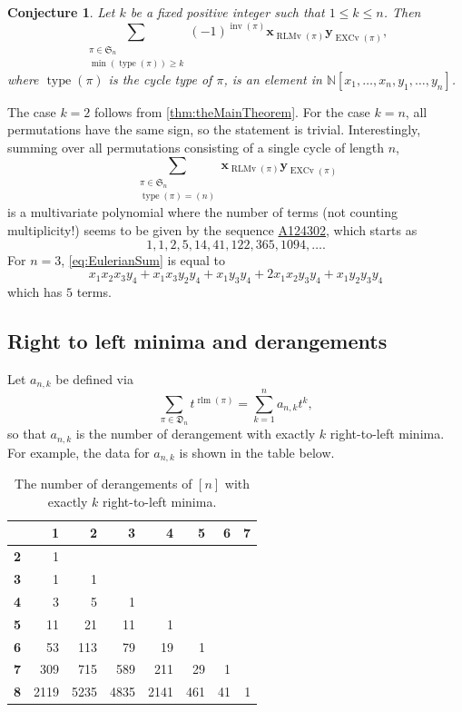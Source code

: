 \documentclass[reqno]{amsart}
\newtheorem{conjecture}[theorem]{Conjecture}
\theoremstyle{definition}
\newcommand{\oeis}[1]{\href{http://oeis.org/#1}{#1}}
\newcommand{\setN}{\mathbb{N}}
\newcommand{\xvec}{\mathbf{x}}
\newcommand{\yvec}{\mathbf{y}}
\newcommand{\symS}{\mathfrak{S}}
\newcommand{\dArr}{\mathfrak{D}}
\DeclareMathOperator{\inv}{inv}
\DeclareMathOperator{\type}{type}
\DeclareMathOperator{\EXCv}{EXCv}
\DeclareMathOperator{\rlm}{rlm}
\DeclareMathOperator{\RLMv}{RLMv}
\begin{document}
\begin{conjecture}
Let $k$ be a fixed positive integer such that $1\leq k\leq n$.
Then
\[
 \sum_{\substack{\pi \in \symS_n\\ \min(\type(\pi))\geq k}} (-1)^{\inv(\pi)}
 \xvec_{\RLMv(\pi)} \yvec_{ \EXCv(\pi)},
\]
where $\type(\pi)$ is the cycle type of $\pi$, is an element in $\setN[x_1,\dotsc,x_n,y_1,\dotsc,y_n]$.
\end{conjecture}

The case $k=2$ follows from \cref{thm:theMainTheorem}.
For the case $k=n$, all permutations have the same sign, so the statement is trivial.
Interestingly, summing over all permutations consisting of a single cycle of length $n$,
\begin{equation}\label{eq:EulerianSum}
 \sum_{\substack{\pi \in \symS_n \\ \type(\pi) = (n)}}
 \xvec_{\RLMv(\pi)} \yvec_{ \EXCv(\pi)}
\end{equation}
is a multivariate polynomial where the number of terms (not counting multiplicity!)
seems to be given by the sequence \oeis{A124302}, which starts as
\[
 1, 1, 2, 5, 14, 41, 122, 365, 1094, \dotsc.
\]
For $n=3$, \eqref{eq:EulerianSum} is equal to
\[
 x_1 x_2 x_3 y_4 + 
 x_1 x_3 y_2 y_4 + 
 x_1 y_3 y_4 + 
 2 x_1 x_2 y_3 y_4 +
 x_1 y_2 y_3 y_4
\]
which has $5$ terms.


\subsection{Right to left minima and derangements}

Let $a_{n,k}$ be defined via
\begin{equation}
 \sum_{\pi \in \dArr_n} t^{\rlm(\pi)} = \sum_{k=1}^n a_{n,k} t^k,
\end{equation}
so that $a_{n,k}$ is the number of derangement with exactly $k$ right-to-left minima.
For example, the data for $a_{n,k}$ is shown in the table below.

\begin{table}[!ht]
\begin{tabular}{rrrrrrrr}
 & \textbf{1} & \textbf{2} & \textbf{3} & \textbf{4}& \textbf{5}& \textbf{6}& \textbf{7} \\
\toprule
\textbf{2}& 1 \\
\textbf{3}&1 & 1\\
\textbf{4}&3 & 5 & 1 \\
\textbf{5}&11 & 21 & 11 & 1 \\
\textbf{6}&53 & 113 & 79 & 19 & 1 \\
\textbf{7}&309 & 715 & 589 & 211 & 29 & 1  \\
\textbf{8}&2119 & 5235 & 4835 & 2141 & 461 & 41 & 1 \\
\end{tabular}
\caption{The number of derangements of $[n]$ with exactly $k$ right-to-left minima.}\label{tab:deArrRLM}
\end{table}
\end{document}
